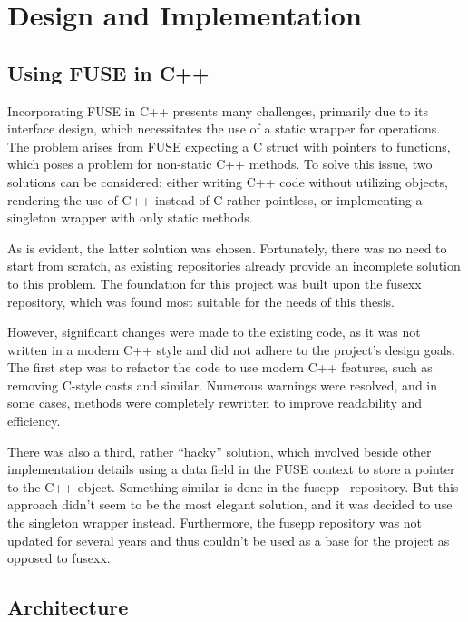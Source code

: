 \chapter{Design and Implementation}
\label{chap:design-and-architecture}

\section{Using FUSE in C++}\label{sec:fuse-in-cpp}

Incorporating FUSE in C++ presents many challenges, primarily due to its interface design, which necessitates the use of a static wrapper for operations.
The problem arises from FUSE expecting a C struct with pointers to functions, which poses a problem for non-static C++ methods.
To solve this issue, two solutions can be considered: either writing C++ code without utilizing objects, rendering the use of C++ instead of C rather pointless, or implementing a singleton wrapper with only static methods.

As is evident, the latter solution was chosen.
Fortunately, there was no need to start from scratch, as existing repositories already provide an incomplete solution to this problem.
The foundation for this project was built upon the fusexx~\cite{fusexx} repository, which was found most suitable for the needs of this thesis.

However, significant changes were made to the existing code, as it was not written in a modern C++ style and did not adhere to the project's design goals.
The first step was to refactor the code to use modern C++ features, such as removing C-style casts and similar.
Numerous warnings were resolved, and in some cases, methods were completely rewritten to improve readability and efficiency.

There was also a third, rather ``hacky'' solution, which involved beside other implementation details using a data field in the FUSE context to store a pointer to the C++ object.
Something similar is done in the fusepp~\cite{fusepp} repository.
But this approach didn't seem to be the most elegant solution, and it was decided to use the singleton wrapper instead.
Furthermore, the fusepp repository was not updated for several years and thus couldn't be used as a base for the project as opposed to fusexx.

\section{Architecture}\label{sec:architecture}

